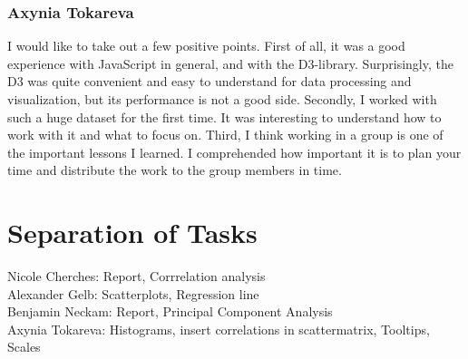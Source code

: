 \documentclass{vgtc}                          %
\begin{document}
\subsubsection{Axynia Tokareva}
I would like to take out a few positive points. First of all, it was a good experience with JavaScript in general, and with the D3-library. Surprisingly, the D3 was quite convenient and easy to understand for data processing and visualization, but its performance is not a good side. Secondly, I worked with such a huge dataset for the first time. It was interesting to understand how to work with it and what to focus on. Third, I think working in a group is one of the important lessons I learned. I comprehended how important it is to plan your time and distribute the work to the group members in time.
\section{Separation of Tasks}
Nicole Cherches: Report, Corrrelation analysis\\
Alexander Gelb: Scatterplots, Regression line\\
Benjamin Neckam: Report, Principal Component Analysis\\
Axynia Tokareva: Histograms, insert correlations in scattermatrix, Tooltips, Scales


\end{document}
